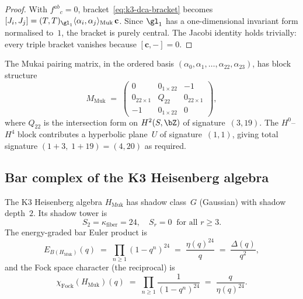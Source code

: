 \begin{proof}
With $f^{ab}{}_{c} = 0$, bracket~\eqref{eq:k3-dca-bracket} becomes
$[J_i, J_j] = (T, T)_{\gl_1} \langle \alpha_i, \alpha_j \rangle_{\mathrm{Muk}}
\, \mathbf{c}$.
Since $\gl_1$ has a one-dimensional invariant form normalised to~$1$,
the bracket is purely central.
The Jacobi identity holds trivially: every triple bracket vanishes
because $[\mathbf{c}, {-}] = 0$.
\end{proof}

The Mukai pairing matrix, in the ordered basis
$(\alpha_0, \alpha_1, \ldots, \alpha_{22}, \alpha_{23})$, has
block structure
\begin{equation}\label{eq:mukai-block-matrix}
  M_{\mathrm{Muk}} \;=\;
  \begin{pmatrix}
    0 & 0_{1 \times 22} & -1 \\
    0_{22 \times 1} & Q_{22} & 0_{22 \times 1} \\
    -1 & 0_{1 \times 22} & 0
  \end{pmatrix},
\end{equation}
where $Q_{22}$ is the intersection form on $H^2(S, \bZ)$ of
signature~$(3, 19)$.
The $H^0$--$H^4$ block contributes a hyperbolic plane~$U$ of
signature~$(1, 1)$, giving total signature
$(1 + 3,\; 1 + 19) = (4, 20)$ as required.

\subsection{Bar complex of the K3 Heisenberg algebra}
\label{subsec:k3-heisenberg-bar}

\begin{proposition}
\label{prop:k3-heisenberg-bar}
\ClaimStatusProvedHere
The K3 Heisenberg algebra $H_{\mathrm{Muk}}$ has shadow class~$G$
(Gaussian) with shadow depth~$2$.  Its shadow tower is
\[
  S_2 = \kappa_{\mathrm{fiber}} = 24, \quad
  S_r = 0 \;\; \text{for all } r \geq 3.
\]
The energy-graded bar Euler product is
\begin{equation}\label{eq:k3-heisenberg-bar-euler}
  E_{B(H_{\mathrm{Muk}})}(q)
  \;=\;
  \prod_{n \geq 1} (1 - q^n)^{24}
  \;=\;
  \frac{\eta(q)^{24}}{q}
  \;=\;
  \frac{\Delta(q)}{q^2},
\end{equation}
and the Fock space character (the reciprocal) is
\begin{equation}\label{eq:k3-heisenberg-fock}
  \chi_{\mathrm{Fock}}(H_{\mathrm{Muk}})(q)
  \;=\;
  \prod_{n \geq 1} \frac{1}{(1 - q^n)^{24}}
  \;=\;
  \frac{q}{\eta(q)^{24}}.
\end{equation}
\end{proposition}

